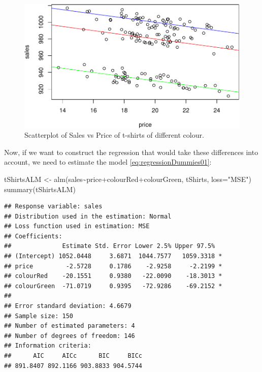 \documentclass[
]{book}
\newenvironment{Shaded}{\begin{snugshade}}{\end{snugshade}}
\newcommand{\AttributeTok}[1]{\textcolor[rgb]{0.77,0.63,0.00}{#1}}
\newcommand{\FunctionTok}[1]{\textcolor[rgb]{0.00,0.00,0.00}{#1}}
\newcommand{\NormalTok}[1]{#1}
\newcommand{\OtherTok}[1]{\textcolor[rgb]{0.56,0.35,0.01}{#1}}
\newcommand{\SpecialCharTok}[1]{\textcolor[rgb]{0.00,0.00,0.00}{#1}}
\newcommand{\StringTok}[1]{\textcolor[rgb]{0.31,0.60,0.02}{#1}}
\theoremstyle{definition}
\theoremstyle{definition}
\theoremstyle{definition}
\theoremstyle{definition}
\theoremstyle{remark}
\begin{document}
\begin{figure}
\centering
\includegraphics{Svetunkov---Statistics-for-Business-Analytics_files/figure-latex/tShirtsScatterPlot-1.pdf}
\caption{\label{fig:tShirtsScatterPlot}Scatterplot of Sales vs Price of t-shirts of different colour.}
\end{figure}

Now, if we want to construct the regression that would take these differences into account, we need to estimate the model \eqref{eq:regressionDummies01}:

\begin{Shaded}
\begin{Highlighting}[]
\NormalTok{tShirtsALM }\OtherTok{\textless{}{-}} \FunctionTok{alm}\NormalTok{(sales}\SpecialCharTok{\textasciitilde{}}\NormalTok{price}\SpecialCharTok{+}\NormalTok{colourRed}\SpecialCharTok{+}\NormalTok{colourGreen, tShirts, }\AttributeTok{loss=}\StringTok{"MSE"}\NormalTok{)}
\FunctionTok{summary}\NormalTok{(tShirtsALM)}
\end{Highlighting}
\end{Shaded}

\begin{verbatim}
## Response variable: sales
## Distribution used in the estimation: Normal
## Loss function used in estimation: MSE
## Coefficients:
##              Estimate Std. Error Lower 2.5% Upper 97.5%  
## (Intercept) 1052.0448     3.6871  1044.7577   1059.3318 *
## price         -2.5728     0.1786    -2.9258     -2.2199 *
## colourRed    -20.1551     0.9380   -22.0090    -18.3013 *
## colourGreen  -71.0719     0.9395   -72.9286    -69.2152 *
## 
## Error standard deviation: 4.6679
## Sample size: 150
## Number of estimated parameters: 4
## Number of degrees of freedom: 146
## Information criteria:
##      AIC     AICc      BIC     BICc 
## 891.8407 892.1166 903.8833 904.5744
\end{verbatim}
\end{document}
